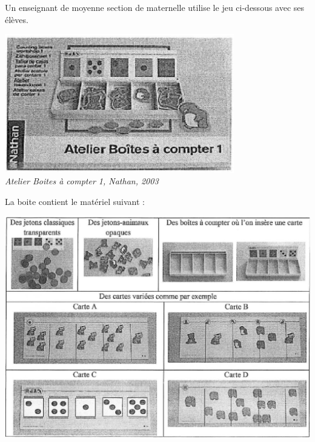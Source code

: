\begin{exercice}[CRPE 2016 G1]
Un enseignant de moyenne section de maternelle utilise le jeu ci-dessous avec ses élèves.
\begin{center}
   \includegraphics[width=10cm]{Nombres_et_calculs_did/Images/Num1_analyse_boite1} \\
   {\it Atelier Boites à compter 1, Nathan, 2003}
\end{center}
La boite contient le matériel suivant :
\begin{center}
   \includegraphics[width=16cm]{Nombres_et_calculs_did/Images/Num1_analyse_boite2} \\ [3mm]
\end{center}

\end{exercice}
